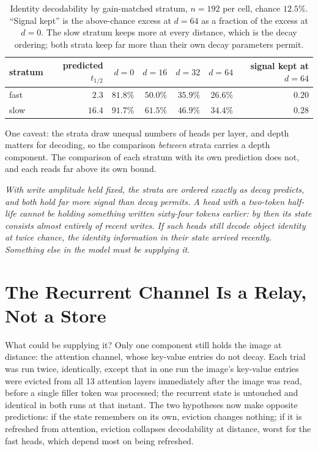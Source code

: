 \begin{table}[t]
\centering\small
\begin{tabular}{lrrrrrr}
\toprule
stratum & predicted $t_{1/2}$ & $d{=}0$ & $d{=}16$ & $d{=}32$ & $d{=}64$ & signal kept at $d{=}64$ \\
\midrule
fast & $2.3$  & $81.8\%$ & $50.0\%$ & $35.9\%$ & $26.6\%$ & $0.20$ \\
slow & $16.4$ & $91.7\%$ & $61.5\%$ & $46.9\%$ & $34.4\%$ & $0.28$ \\
\bottomrule
\end{tabular}
\caption{Identity decodability by gain-matched stratum, $n = 192$ per cell,
chance $12.5\%$. ``Signal kept'' is the above-chance excess at $d{=}64$ as a
fraction of the excess at $d{=}0$. The slow stratum keeps more at every
distance, which is the decay ordering; both strata keep far more than their
own decay parameters permit.}
\label{tab:strata}
\end{table}

One caveat: the strata draw unequal numbers of heads per layer, and depth
matters for decoding, so the comparison \emph{between} strata carries a depth
component. The comparison of each stratum with its own prediction does not,
and each reads far above its own bound.

\emph{With write amplitude held fixed, the strata are ordered exactly as decay
predicts, and both hold far more signal than decay permits. A head with a
two-token half-life cannot be holding something written sixty-four tokens
earlier: by then its state consists almost entirely of recent writes. If such
heads still decode object identity at twice chance, the identity information
in their state arrived recently. Something else in the model must be supplying
it.}

\section{The Recurrent Channel Is a Relay, Not a Store}
\label{sec:relay}

What could be supplying it? Only one component still holds the image at
distance: the attention channel, whose key-value entries do not decay. Each
trial was run twice, identically, except that in one run the image's key-value
entries were evicted from all 13 attention layers immediately after the image
was read, before a single filler token was processed; the recurrent state is
untouched and identical in both runs at that instant. The two hypotheses now
make opposite predictions: if the state remembers on its own, eviction changes
nothing; if it is refreshed from attention, eviction collapses decodability at
distance, worst for the fast heads, which depend most on being refreshed.


